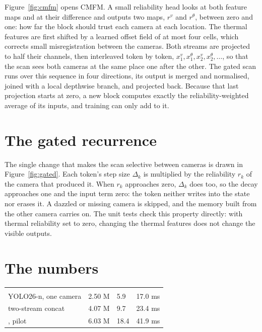 Figure~\ref{fig:cmfm} opens CMFM. A small reliability head looks at both feature maps and at their difference and
outputs two maps, $r^{v}$ and $r^{\theta}$, between zero and one: how far the block should trust each camera at
each location. The thermal features are first shifted by a learned offset field of at most four cells, which
corrects small misregistration between the cameras. Both streams are projected to half their channels, then
interleaved token by token, $x^{v}_{1}, x^{\theta}_{1}, x^{v}_{2}, x^{\theta}_{2}, \dots$, so that the scan sees both
cameras at the same place one after the other. The gated scan runs over this sequence in four directions, its
output is merged and normalised, joined with a local depthwise branch, and projected back. Because that last
projection starts at zero, a new block computes exactly the reliability-weighted average of its inputs, and
training can only add to it.


\section{The gated recurrence}

The single change that makes the scan selective between cameras is drawn in Figure~\ref{fig:gated}. Each token's
step size $\Delta_k$ is multiplied by the reliability $r_k$ of the camera that produced it. When $r_k$ approaches
zero, $\Delta_k$ does too, so the decay approaches one and the input term zero: the token neither writes into the
state nor erases it. A dazzled or missing camera is skipped, and the memory built from the other camera carries
on. The unit tests check this property directly: with thermal reliability set to zero, changing the thermal
features does not change the visible outputs.


\section{The numbers}

\begin{tabularx}{\textwidth}{@{}P{5.2cm}LLL@{}}
 &  &  &  \\
YOLO26-n, one camera & 2.50 M & 5.9 & 17.0 ms \\
two-stream concat & 4.07 M & 9.7 & 23.4 ms \\
\method{}, pilot & 6.03 M & 18.4 & 41.9 ms \\
\end{tabularx}

